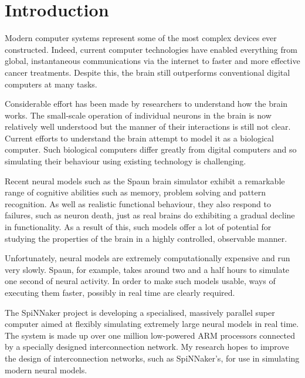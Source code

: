 \chapter{Introduction}
	
	
	Modern computer systems represent some of the most complex devices ever
	constructed. Indeed, current computer technologies have enabled everything
	from global, instantaneous communications via the internet to faster and more
	effective cancer treatments\cite{nassif}. Despite this, the brain still
	outperforms conventional digital computers at many tasks.
	
	Considerable effort has been made by researchers to understand how the brain
	works. The small-scale operation of individual neurons in the brain is now
	relatively well understood but the manner of their interactions is still not
	clear. Current efforts to understand the brain attempt to model it as a
	biological computer. Such biological computers differ greatly from digital
	computers and so simulating their behaviour using existing technology is
	challenging.
	
	Recent neural models such as the Spaun brain simulator \cite{eliasmith12}
	exhibit a remarkable range of cognitive abilities such as memory, problem
	solving and pattern recognition. As well as realistic functional behaviour,
	they also respond to failures, such as neuron death, just as real brains do
	exhibiting a gradual decline in functionality. As a result of this, such
	models offer a lot of potential for studying the properties of the brain in a
	highly controlled, observable manner.
	
	Unfortunately, neural models are extremely computationally expensive and run
	very slowly. Spaun, for example, takes around two and a half hours to simulate
	one second of neural activity. In order to make such models usable, ways of
	executing them faster, possibly in real time are clearly required.
	
	The SpiNNaker project is developing a specialised, massively parallel super
	computer aimed at flexibly simulating extremely large neural models in real
	time. The system is made up over one million low-powered ARM processors
	connected by a specially designed interconnection network. My research hopes
	to improve the design of interconnection networks, such as SpiNNaker's, for
	use in simulating modern neural models.
	
